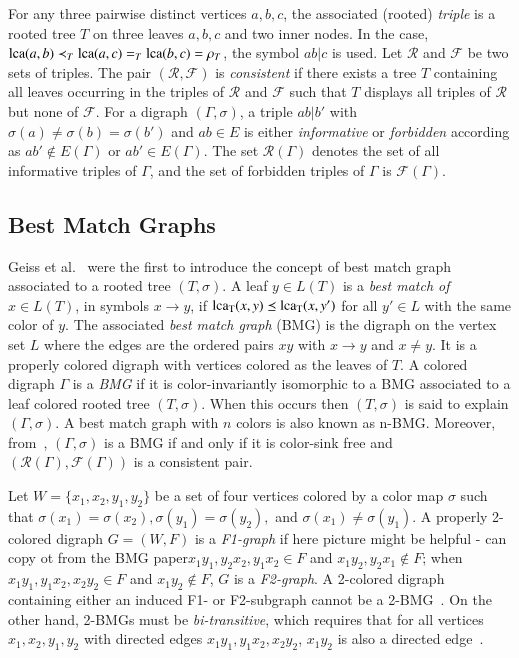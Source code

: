 \documentclass[final,3p,times]{elsarticle}
\newcommand{\TODO}[1]{\begingroup\color{red}#1\endgroup}
\begin{document}
For any three pairwise distinct vertices $a,b,c$, the associated (rooted) \emph{triple} is a rooted tree $T$ on three leaves $a,b,c$ and two inner nodes. In the case, ${\rm{lca}}(a,b)\prec_T {\rm{lca}}(a,c)=_T{\rm{lca}}(b,c)=\rho_T$, the symbol $ab|c$ is used. Let $\mathscr{R}$ and $\mathscr{F}$ be two sets of triples. The pair $(\mathscr{R},\mathscr{F})$ is \emph{consistent} if there exists a tree $T$ containing all leaves occurring in the triples of $\mathscr{R}$ and $\mathscr{F}$ such that $T$ displays all triples of $\mathscr{R}$ but none of $\mathscr{F}$. For a digraph $(\Gamma,\sigma)$, a triple $ab|b'$ with $\sigma(a)\ne \sigma(b)=\sigma(b')$ and $ab\in E$ is either {\emph{informative}} or {\emph{forbidden}} according as $ab'\not\in E(\Gamma)$ or $ab'\in E(\Gamma)$. The set $\mathscr{R}(\Gamma)$ denotes the set of all informative triples of $\Gamma$, and the set of forbidden triples of $\Gamma$ is $\mathscr{F}(\Gamma)$. 

\subsection{Best Match Graphs}
Geiss et al.~\cite{Geiss:19a} were the first to introduce the concept of best match graph associated to a rooted tree $(T,\sigma)$. A leaf $y\in L(T)$ is a {\emph{best match of}} $x\in L(T)$, in symbols $x\rightarrow y$, if ${\rm{lca_T}}(x,y)\preceq {\rm{lca_T}}(x,y')$ for all $y'\in L$ with the same color of $y$. The associated {\emph{best match graph}} (BMG) is the digraph on the vertex set $L$ where the edges are the ordered pairs $xy$ with $x\rightarrow y$ and  $x\neq y$. It is a properly colored digraph with vertices colored as the leaves of $T$. A colored digraph $\Gamma$ is a \emph{BMG} if it is color-invariantly isomorphic to a BMG associated to a leaf colored rooted tree $(T,\sigma)$. When this occurs then $(T,\sigma)$ is said to explain $(\Gamma,\sigma)$. A best match graph with $n$ colors is also known as n-BMG. Moreover, from~\cite[Proposition~2.3]{korchmaros2021quasi}, $(\Gamma,\sigma)$ is a BMG if and only if it is color-sink free and $(\mathscr{R}(\Gamma),\mathscr{F}(\Gamma))$ is a consistent pair. 

Let $W=\{x_1,x_2,y_1,y_2\}$ be a set of four vertices colored by a color map $\sigma$ such that $\sigma(x_1)=\sigma(x_2),\sigma(y_1)=\sigma(y_2),$ and $\sigma(x_1)\neq \sigma(y_1)$. A properly 2-colored digraph $G=(W,F)$ is a \emph{F1-graph} if \TODO{here picture might be helpful - can copy ot from the BMG paper}$x_1y_1,y_2x_2,y_1x_2 \in F$ and $x_1 y_2,y_2x_1 \notin F$; when $x_1y_1,y_1x_2,x_2y_2 \in F$ and $x_1y_2 \notin F$, $G$ is a \emph{F2-graph}. A 2-colored digraph containing either an induced F1- or F2-subgraph cannot be a 2-BMG~\cite[Lemma 4.2]{schaller2021complexity}. On the other hand, 2-BMGs must be \emph{bi-transitive}, which requires that for all vertices $x_1, x_2, y_1, y_2$ with directed edges $x_1y_1, y_1x_2, x_2y_2$, $x_1y_2$ is also a directed edge~\cite{Korchmaros:21a}.
\end{document}

